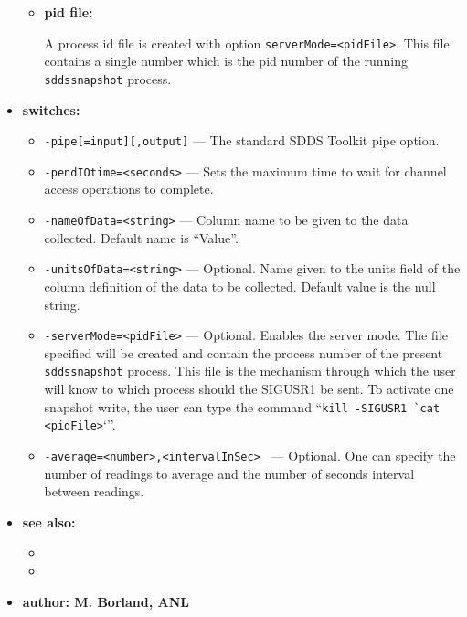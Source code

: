 \begin{itemize}
\begin{itemize}
\item {\bf pid file:}\par
A process id file is created with option {\verb+serverMode=<pidFile>+}. This file contains a single
number which is the pid number of the running {\verb+sddssnapshot+} process.
\end{itemize}
%
\item {\bf switches:}
%
%
    \begin{itemize}
%
%
        \item {\tt -pipe[=input][,output]} --- The standard SDDS Toolkit pipe option.
        \item {\tt -pendIOtime=<seconds>} --- Sets the maximum time to wait for channel access operations to complete.
        \item {\tt -nameOfData=<string>} --- Column name to be given to the data collected. Default name is ``Value''.
        \item {\tt -unitsOfData=<string>} --- Optional. Name given to the units field of the column definition
                        of the data to be collected. Default value is the null string.
        \item {\tt -serverMode=<pidFile>} --- Optional. Enables the server mode. The file specified will be created and contain
                the process number of the present \verb+sddssnapshot+ process. This file is the mechanism
                through which the user will know to which process should the SIGUSR1 be sent.
                To activate one snapshot write, the user can type
                the command ``\verb+kill -SIGUSR1 `cat <pidFile>+`''.
        \item {\tt -average=<number>,<intervalInSec> } --- Optional. One can specify the number of readings to
                average and the number of seconds interval between readings.
    \end{itemize}

\item {\bf see also:}
    \begin{itemize}
%
%
    \item {}
    \item {}
    \end{itemize}
%
%
\item {\bf author: M. Borland, ANL} 
\end{itemize}
